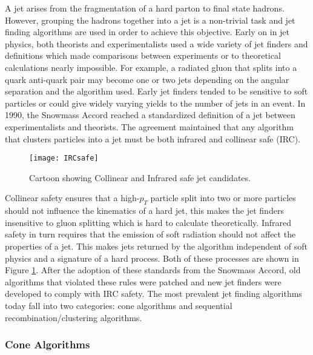 A jet arises from the fragmentation of a hard parton to final state hadrons.  However, grouping the hadrons together into a jet is a non-trivial task and jet finding algorithms are used in order to achieve this objective.  Early on in jet physics, both theorists and experimentalists used a wide variety of jet finders and definitions which made comparisons between experiments or to theoretical calculations nearly impossible\cite{Atkin:2015msa}.  For example, a radiated gluon that splits into a quark anti-quark pair may become one or two jets depending on the angular separation and the algorithm used.  Early jet finders tended to be sensitive to soft particles or could give widely varying yields to the number of jets in an event.  In 1990, the Snowmass Accord\cite{Huth:217490} reached a standardized definition of a jet between experimentalists and theorists.  The agreement maintained that any algorithm that clusters particles into a jet must be both infrared and collinear safe (IRC).  

\begin{figure}[h]
\texttt{[image: IRCsafe]}
\centering
\caption{Cartoon showing Collinear and Infrared safe jet candidates\cite{Blazey:2000qt}.}
\label{fig:IRCsafe}
\end{figure}


Collinear safety ensures that a high-$p_{T}$ particle split into two or more particles should not influence the kinematics of a hard jet, this makes the jet finders insensitive to gluon splitting which is hard to calculate theoretically.  Infrared safety in turn requires that the emission of soft radiation should not affect the properties of a jet.  This makes jets returned by the algorithm independent of soft physics and a signature of a hard process.  Both of these processes are shown in Figure \ref{fig:IRCsafe}. After the adoption of these standards from the Snowmass Accord, old algorithms that violated these rules were patched and new jet finders were developed to comply with IRC safety.  The most prevalent jet finding algorithms today fall into two categories: cone algorithms and sequential recombination/clustering algorithms.

\subsubsection{Cone Algorithms}

